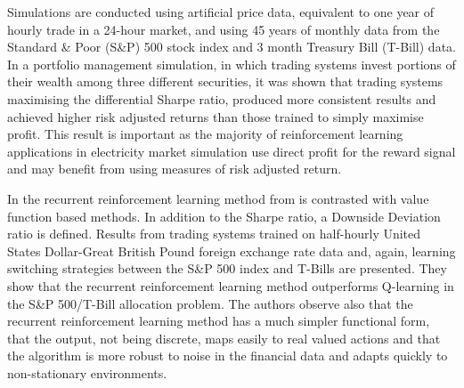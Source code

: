Simulations are conducted using artificial price data, equivalent to one year
of hourly trade in a 24-hour market, and using 45 years of monthly data from
the Standard \& Poor (S\&P) 500 stock index and 3 month Treasury Bill (T-Bill)
data. In a portfolio management simulation, in which trading systems invest
portions of their wealth among three different securities, it was shown
that trading systems maximising the differential Sharpe ratio, produced more
consistent results and achieved higher risk adjusted returns than those
trained to simply maximise profit.  This result is important as the majority
of reinforcement learning applications in electricity market simulation use
direct profit for the reward signal and may benefit from using measures of risk
adjusted return.

In  the recurrent reinforcement learning method from
 is contrasted with value function based methods.  In addition
to the Sharpe ratio, a Downside Deviation ratio is defined.  Results from trading
systems trained on half-hourly United States Dollar-Great British Pound foreign
exchange rate data and, again, learning switching strategies between the S\&P
500 index and T-Bills are presented.  They show that the recurrent
reinforcement learning method outperforms Q-learning in the S\&P
500/T-Bill allocation problem.  The authors observe also that the recurrent
reinforcement learning method has a much simpler functional form, that the
output, not being discrete, maps easily to real valued actions and that the
algorithm is more robust to noise in the financial data and adapts quickly to
non-stationary environments.

